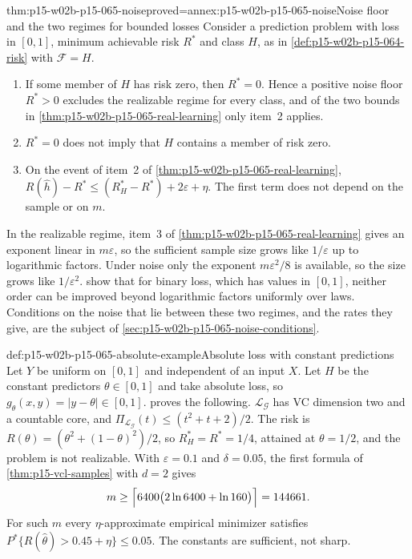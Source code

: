 \begin{hbtheorem}{thm:p15-w02b-p15-065-noise}{proved=annex:p15-w02b-p15-065-noise}{Noise floor and the two regimes for bounded losses}
Consider a prediction problem with loss in \([0,1]\), minimum achievable
risk \(R^{*}\) and class \(H\), as in
\cref{def:p15-w02b-p15-064-risk} with \(\mathcal F=H\).
\begin{enumerate}
\item If some member of \(H\) has risk zero, then \(R^{*}=0\). Hence a
      positive noise floor \(R^{*}>0\) excludes the realizable regime for
      every class, and of the two bounds in
      \cref{thm:p15-w02b-p15-065-real-learning} only item~2 applies.
\item \(R^{*}=0\) does not imply that \(H\) contains a member of risk zero.
\item On the event of item~2 of \cref{thm:p15-w02b-p15-065-real-learning},
      \(R(\widehat h)-R^{*}\leq(R_H^{*}-R^{*})+2\varepsilon+\eta\). The first
      term does not depend on the sample or on \(m\).
\end{enumerate}
\end{hbtheorem}

In the realizable regime, item~3 of
\cref{thm:p15-w02b-p15-065-real-learning} gives an exponent linear in
\(m\varepsilon\), so the sufficient sample size grows like \(1/\varepsilon\)
up to logarithmic factors. Under noise only the exponent
\(m\varepsilon^2/8\) is available, so the size grows like \(1/\varepsilon^2\).
show that for binary loss, which has values in \([0,1]\), neither order
can be improved beyond logarithmic factors uniformly over laws. Conditions
on the noise that lie between these two regimes, and the rates they give,
are the subject of \cref{sec:p15-w02b-p15-065-noise-conditions}.

\begin{hbexample}{def:p15-w02b-p15-065-absolute-example}{Absolute loss with constant predictions}
Let \(Y\) be uniform on \([0,1]\) and independent of an input \(X\). Let
\(H\) be the constant predictors \(\theta\in[0,1]\) and take absolute loss,
so \(g_\theta(x,y)=|y-\theta|\in[0,1]\).
 proves the following.
\(\mathcal L_{\mathcal G}\) has VC dimension two and a countable core, and
\(\Pi_{\mathcal L_{\mathcal G}}(t)\leq(t^2+t+2)/2\). The risk is
\(R(\theta)=(\theta^2+(1-\theta)^2)/2\), so \(R_H^{*}=R^{*}=1/4\),
attained at \(\theta=1/2\), and the problem is not realizable. With
\(\varepsilon=0.1\) and \(\delta=0.05\), the first formula of
\cref{thm:p15-vcl-samples} with \(d=2\) gives
\[
 m\geq\Bigl\lceil 6400\bigl(2\ln6400+\ln160\bigr)\Bigr\rceil=144661 .
\]
For such \(m\) every \(\eta\)-approximate empirical minimizer satisfies
\(P^{*}\{R(\widehat\theta)>0.45+\eta\}\leq0.05\). The constants are
sufficient, not sharp.
\end{hbexample}

